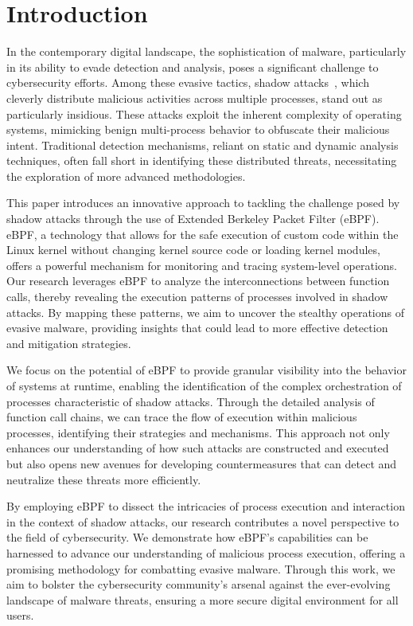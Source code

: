 \section{Introduction}
In the contemporary digital landscape, the sophistication of malware,
particularly in its ability to evade detection and analysis,
poses a significant challenge to cybersecurity efforts.
Among these evasive tactics, shadow attacks~\cite{Weiqin:ShadowAttack},
which cleverly distribute malicious activities across multiple processes,
stand out as particularly insidious.
These attacks exploit the inherent complexity of operating systems,
mimicking benign multi-process behavior to obfuscate their malicious intent.
Traditional detection mechanisms, reliant on static and dynamic analysis techniques,
often fall short in identifying these distributed threats,
necessitating the exploration of more advanced methodologies.

This paper introduces an innovative approach to tackling the
challenge posed by shadow attacks through the use of Extended Berkeley Packet Filter (eBPF).
eBPF, a technology that allows for the safe execution of custom code within the
Linux kernel without changing kernel source code or loading kernel modules,
offers a powerful mechanism for monitoring and tracing system-level operations.
Our research leverages eBPF to analyze the interconnections between function calls,
thereby revealing the execution patterns of processes involved in shadow attacks.
By mapping these patterns, we aim to uncover the stealthy operations of evasive malware,
providing insights that could lead to more effective detection and mitigation strategies.

We focus on the potential of eBPF to provide granular visibility into the behavior
of systems at runtime, enabling the identification of the complex orchestration of
processes characteristic of shadow attacks. Through the detailed analysis of function
call chains, we can trace the flow of execution within malicious processes,
identifying their strategies and mechanisms. This approach not only enhances
our understanding of how such attacks are constructed and executed but also opens
new avenues for developing countermeasures that can detect and neutralize these threats more efficiently.

By employing eBPF to dissect the intricacies of process execution and interaction in the
context of shadow attacks, our research contributes a novel perspective to the field of
cybersecurity. We demonstrate how eBPF's capabilities can be harnessed to advance our
understanding of malicious process execution, offering a promising methodology for combatting
evasive malware. Through this work, we aim to bolster the cybersecurity community's arsenal against
the ever-evolving landscape of malware threats, ensuring a more secure digital environment for all users.


